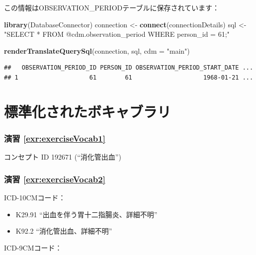 \documentclass[
  11pt]{book}
\newenvironment{Shaded}{\begin{snugshade}}{\end{snugshade}}
\newcommand{\AttributeTok}[1]{\textcolor[rgb]{0.13,0.29,0.53}{#1}}
\newcommand{\FunctionTok}[1]{\textcolor[rgb]{0.13,0.29,0.53}{\textbf{#1}}}
\newcommand{\NormalTok}[1]{#1}
\newcommand{\OtherTok}[1]{\textcolor[rgb]{0.56,0.35,0.01}{#1}}
\newcommand{\StringTok}[1]{\textcolor[rgb]{0.31,0.60,0.02}{#1}}
\providecommand{\tightlist}{%
  \setlength{\itemsep}{0pt}\setlength{\parskip}{0pt}}
\theoremstyle{definition}
\theoremstyle{definition}
\theoremstyle{definition}
\theoremstyle{definition}
\theoremstyle{remark}
\begin{document}
この情報はOBSERVATION\_PERIODテーブルに保存されています：

\begin{Shaded}
\begin{Highlighting}[]
\FunctionTok{library}\NormalTok{(DatabaseConnector)}
\NormalTok{connection }\OtherTok{\textless{}{-}} \FunctionTok{connect}\NormalTok{(connectionDetails)}
\NormalTok{sql }\OtherTok{\textless{}{-}} \StringTok{"SELECT *}
\StringTok{FROM @cdm.observation\_period}
\StringTok{WHERE person\_id = 61;"}

\FunctionTok{renderTranslateQuerySql}\NormalTok{(connection, sql, }\AttributeTok{cdm =} \StringTok{"main"}\NormalTok{)}
\end{Highlighting}
\end{Shaded}

\begin{verbatim}
##   OBSERVATION_PERIOD_ID PERSON_ID OBSERVATION_PERIOD_START_DATE ...
## 1                    61        61                    1968-01-21 ...
\end{verbatim}

\section{標準化されたボキャブラリ}\label{Vocabanswers}

\subsubsection*{演習 \ref{exr:exerciseVocab1}}\label{ux6f14ux7fd2-refexrexercisevocab1}

コンセプト ID 192671 (``消化管出血'')

\subsubsection*{演習 \ref{exr:exerciseVocab2}}\label{ux6f14ux7fd2-refexrexercisevocab2}

ICD-10CMコード：

\begin{itemize}
\tightlist
\item
  K29.91 ``出血を伴う胃十二指腸炎、詳細不明''
\item
  K92.2 ``消化管出血、詳細不明''
\end{itemize}

ICD-9CMコード：
\end{document}
